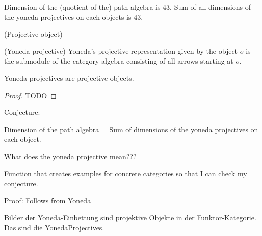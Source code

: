Dimension of the (quotient of the) path algebra is 43.
Sum of all dimensions of the yoneda projectives on each objects is 43.

\begin{definition}{(Projective object)}

\end{definition}

\begin{definition}{(Yoneda projective)}
Yoneda's projective representation given by the object $o$ is the submodule of the category algebra
consisting of all arrows starting at $o$.
\end{definition}

\begin{thm}
Yoneda projectives are projective objects.
\begin{proof}
TODO
\end{proof}
\end{thm}

Conjecture: 

Dimension of the path algebra = Sum of dimensions of the yoneda projectives on each object.

What does the yoneda projective mean???

Function that creates examples for concrete categories so that I can check my conjecture.

Proof: Follows from Yoneda

Bilder der Yoneda-Einbettung sind projektive Objekte in der Funktor-Kategorie. Das sind die YonedaProjectives.